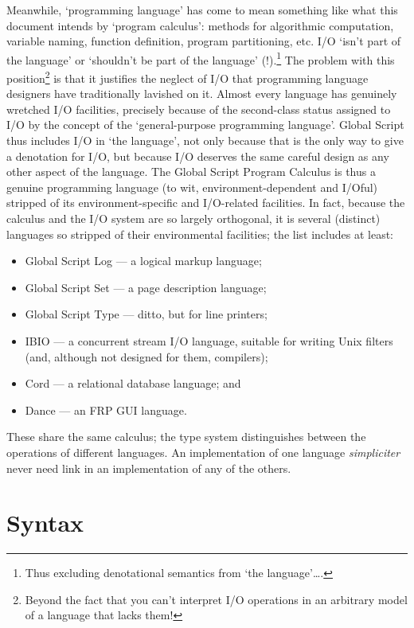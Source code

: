 \documentclass{report}
\begin{document}
Meanwhile, `programming language' has come to mean something like what this document intends by `program calculus':
methods for algorithmic computation, variable naming, function definition, program partitioning, etc.
I/O `isn't part of the language' or `shouldn't be part of the language' (!).\footnote{Thus excluding denotational semantics from `the language'\ldots.}
The problem with this position\footnote{Beyond the fact that you can't interpret I/O operations in an arbitrary model of a language that lacks them!}
is that it justifies the neglect of I/O that programming language designers have traditionally lavished on it.
Almost every language has genuinely wretched I/O facilities,
precisely because of the second-class status assigned to I/O by the concept of the `general-purpose programming language'.
Global Script thus includes I/O in `the language', not only because that is the only way to give a denotation for I/O,
but because I/O deserves the same careful design as any other aspect of the language.
The Global Script Program Calculus is thus a genuine programming language (to wit, environment-dependent and I/Oful)
stripped of its environment-specific and I/O-related facilities.
In fact, because the calculus and the I/O system are so largely orthogonal, it is several (distinct) languages so stripped of their environmental facilities;
the list includes at least:
\begin{itemize}
    \item Global Script Log --- a logical markup language;
    \item Global Script Set --- a page description language;
    \item Global Script Type --- ditto, but for line printers;
    \item IBIO --- a concurrent stream I/O language, suitable for writing Unix filters (and, although not designed for them, compilers);
    \item Cord --- a relational database language; and
    \item Dance --- an FRP GUI language.
\end{itemize}
These share the same calculus; the type system distinguishes between the operations of different languages.
An implementation of one language \emph{simpliciter} never need link in an implementation of any of the others.

\section{Syntax}
\end{document}
